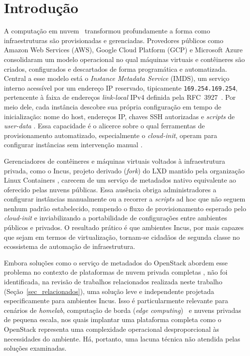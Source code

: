\section{Introdução}
\label{sec_introducao}

A computação em nuvem~\citep{mell2011nist} transformou profundamente a forma como infraestruturas são provisionadas e gerenciadas. Provedores públicos como Amazon Web Services (AWS), Google Cloud Platform (GCP) e Microsoft Azure consolidaram um modelo operacional no qual máquinas virtuais e contêineres são criados, configurados e descartados de forma programática e automatizada. Central a esse modelo está o \textit{Instance Metadata Service} (IMDS), um serviço interno acessível por um endereço IP reservado, tipicamente \texttt{169.254.169.254}, pertencente à faixa de endereços \textit{link-local} IPv4 definida pela RFC~3927~\citep{rfc3927}. Por meio dele, cada instância descobre sua própria configuração em tempo de inicialização: nome do host, endereços IP, chaves SSH autorizadas e \textit{scripts} de \textit{user-data} \citep{aws_imds}. Essa capacidade é o alicerce sobre o qual ferramentas de provisionamento automatizado, especialmente o \textit{cloud-init}, operam para configurar instâncias sem intervenção manual \citep{cloudinit2024}.

Gerenciadores de contêineres e máquinas virtuais voltados à infraestrutura privada, como o Incus, projeto derivado (\textit{fork}) do LXD mantido pela organização Linux Containers \citep{incus2024, incus_announcement}, carecem de um serviço de metadados nativo equivalente ao oferecido pelas nuvens públicas. Essa ausência obriga administradores a configurar instâncias manualmente ou a recorrer a \textit{scripts} ad hoc que não seguem nenhum padrão estabelecido, rompendo o fluxo de provisionamento esperado pelo \textit{cloud-init} e inviabilizando a portabilidade de configurações entre ambientes públicos e privados. O resultado prático é que ambientes Incus, por mais capazes que sejam em termos de virtualização, tornam-se cidadãos de segunda classe no ecossistema de automação de infraestrutura.

Embora soluções como o serviço de metadados do OpenStack abordem esse problema no contexto de plataformas de nuvem privada completas \citep{openstack_metadata}, não foi identificada, na revisão de trabalhos relacionados realizada neste trabalho (Seção~\ref{sec_relacionados}), uma solução leve e independente projetada especificamente para ambientes Incus. Isso é particularmente relevante para cenários de \textit{homelab}, computação de borda (\textit{edge computing})~\citep{shi2016} e nuvens privadas de pequena escala, nos quais implantar uma plataforma completa como o OpenStack representa uma complexidade operacional desproporcional às necessidades do ambiente. Há, portanto, uma lacuna técnica não atendida pelas soluções examinadas.

